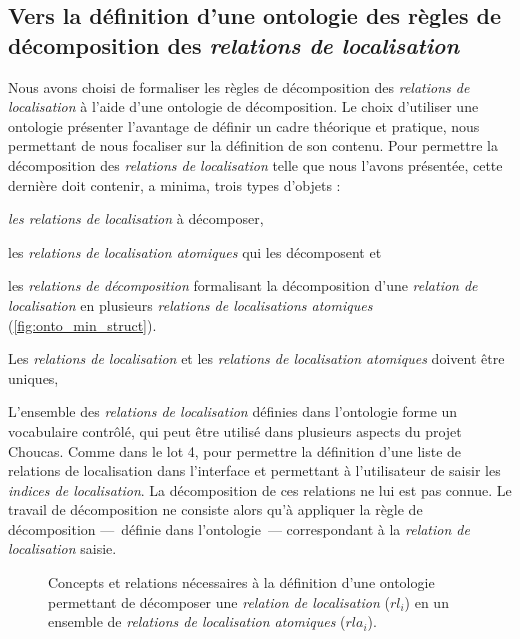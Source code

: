 

\subsection{Vers la définition d'une ontologie des règles de
  décomposition des \emph{relations de localisation}}

Nous avons choisi de formaliser les règles de décomposition des
\emph{relations de localisation} à l'aide d'une ontologie de
décomposition. Le choix d'utiliser une ontologie présenter l'avantage
de définir un cadre théorique et pratique, nous permettant de nous
focaliser sur la définition de son contenu. Pour permettre la
décomposition des \emph{relations de localisation} telle que nous
l'avons présentée, cette dernière doit contenir, a minima, trois types
d'objets :
%
\begin{enumerate*}[label=(\alph*)]
\item \emph{les relations de localisation} à décomposer,
\item les \emph{relations de localisation atomiques} qui les
  décomposent et
\item les \emph{relations de décomposition} formalisant la
  décomposition d'une \emph{relation de localisation} en plusieurs
  \emph{relations de localisations atomiques}
  (\autoref{fig:onto_min_struct}).
\end{enumerate*}
%
Les \emph{relations de localisation} et les \emph{relations de
  localisation atomiques} doivent être uniques, 

L'ensemble des \emph{relations de localisation} définies dans
l'ontologie forme un vocabulaire contrôlé, qui peut être utilisé dans
plusieurs aspects du projet Choucas. Comme dans le lot 4, pour
permettre la définition d'une liste de relations de localisation dans
l'interface et permettant à l'utilisateur de saisir les \emph{indices
  de localisation}. La décomposition de ces relations ne lui est pas
connue. Le travail de décomposition ne consiste alors qu'à appliquer
la règle de décomposition ---~définie dans l'ontologie~---
correspondant à la \emph{relation de localisation} saisie.

\begin{figure}
  \centering
   
  \caption[Structure générale d'une ontologie de
  décomposition]{Concepts et relations nécessaires à la définition
    d'une ontologie permettant de décomposer une \emph{relation de
      localisation} ($rl_i$) en un ensemble de \emph{relations de
      localisation atomiques} ($rla_i$).}
  \label{fig:onto_min_struct}
\end{figure}


